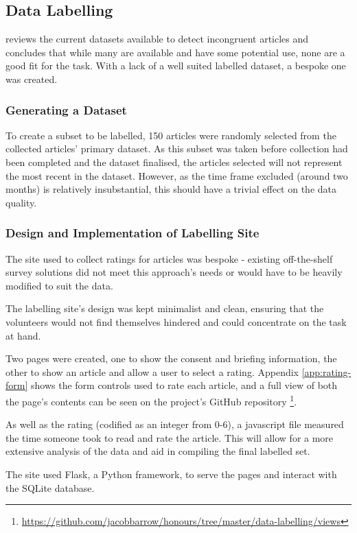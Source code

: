\subsection{Data Labelling}
 reviews the current datasets available to detect incongruent articles and concludes that while many are available and have some potential use, none are a good fit for the task. With a lack of a well suited labelled dataset, a bespoke one was created.

\subsubsection{Generating a Dataset}
To create a subset to be labelled, 150 articles were randomly selected from the collected articles' primary dataset. As this subset was taken before collection had been completed and the dataset finalised, the articles selected will not represent the most recent in the dataset. However, as the time frame excluded (around two months) is relatively insubstantial, this should have a trivial effect on the data quality.

\subsubsection{Design and Implementation of Labelling Site}
The site used to collect ratings for articles was bespoke - existing off-the-shelf survey solutions did not meet this approach's needs or would have to be heavily modified to suit the data.

The labelling site's design was kept minimalist and clean, ensuring that the volunteers would not find themselves hindered and could concentrate on the task at hand. 

Two pages were created, one to show the consent and briefing information, the other to show an article and allow a user to select a rating. Appendix \ref{app:rating-form} shows the form controls used to rate each article, and a full view of both the page's contents can be seen on the project's GitHub repository \footnote{\url{https://github.com/jacobbarrow/honours/tree/master/data-labelling/views}}.

As well as the rating (codified as an integer from 0-6), a javascript file measured the time someone took to read and rate the article. This will allow for a more extensive analysis of the data and aid in compiling the final labelled set.

The site used Flask, a Python framework, to serve the pages and interact with the SQLite database.


